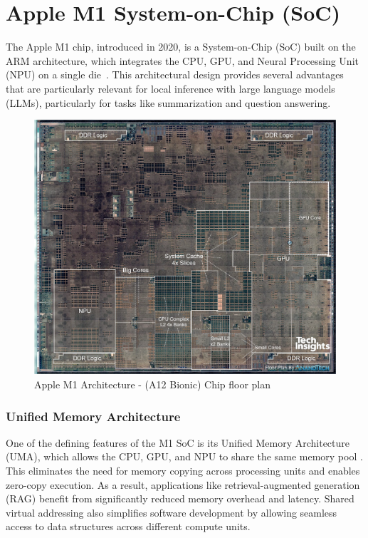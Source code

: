 \section{Apple M1 System-on-Chip (SoC)}
\label{sec:AppleM1System-on-Chip} 

The Apple M1 chip, introduced in 2020, is a System-on-Chip (SoC) built on the ARM architecture, which integrates the CPU, GPU, and Neural Processing Unit (NPU) on a single die~\cite{apple2020m1}. This architectural design provides several advantages that are particularly relevant for local inference with large language models (LLMs), particularly for tasks like summarization and question answering.

\begin{figure}[h]
    \centering
    \includegraphics[width=0.8\linewidth]{images/AppleM1SOC.jpeg}
    \caption{ Apple M1 Architecture - (A12 Bionic) Chip floor plan~\cite{hollemans2020apple}}
    \label{fig:AppleM1Architecture}
\end{figure}

\subsubsection*{Unified Memory Architecture}
One of the defining features of the M1 SoC is its Unified Memory Architecture (UMA), which allows the CPU, GPU, and NPU to share the same memory pool \cite{hollemans2020apple}. This eliminates the need for memory copying across processing units and enables zero-copy execution. As a result, applications like retrieval-augmented generation (RAG) benefit from significantly reduced memory overhead and latency. Shared virtual addressing also simplifies software development by allowing seamless access to data structures across different compute units.

